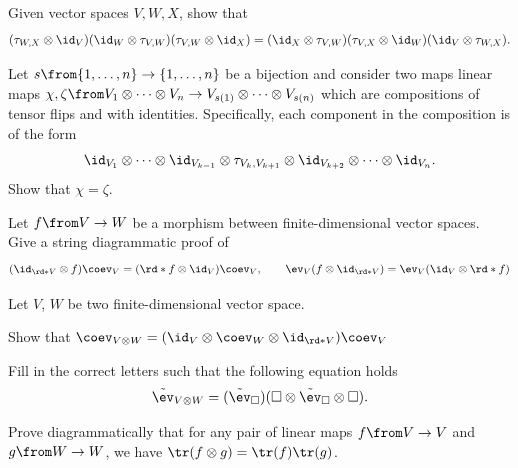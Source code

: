 \documentclass[a4paper,oneside, 12pt]{amsart}
\begin{document}
\begin{exercise}\label{exe:braid-relations}
  Given vector spaces \(V,W, X\), show that
  \begin{equation*}
    (\tau_{W,X}\otimes \id_{V})(\id_{W}\otimes \tau_{V,W})(\tau_{V,W}\otimes \id_{X})
    =
    (\id_{X}\otimes \tau_{V,W})(\tau_{V,X} \otimes \id_{W})(\id_{V}\otimes \tau_{W,X}).
  \end{equation*}

  Let \(s \from\{1, \dots , n\} \to \{1, \dots , n\}\) be a bijection and consider two maps linear maps \(\chi, \zeta \from V_{1} \otimes \dots \otimes V_{n} \to V_{s(1)} \otimes \dots \otimes V_{s(n)}\) which are compositions of tensor flips and  with identities.
  Specifically, each component in the composition is of the form
  \begin{equation*}
    \id_{V_1} \otimes \dots \otimes \id_{V_{k-1}} \otimes \tau_{V_k, V_{k+1}} \otimes \id_{V_{k+2}} \otimes \dots \otimes \id_{V_n}.
  \end{equation*}
  Show that  \(\chi = \zeta\).
\end{exercise}

\begin{exercise}
  Let \(f\from V\to W\) be a morphism between finite-dimensional vector spaces.
  Give a string diagrammatic proof of
  \begin{equation*}
    (\id_{\rd*{V}}\otimes f)\coev_{V} = (\rd*{f} \otimes \id_{V})\coev_{V}, \qquad
    \ev_V (f \otimes \id_{\rd*{V}}) = \ev_{V}(\id_{V}\otimes \rd*{f})
  \end{equation*}

\end{exercise}

\begin{exercise}
  Let \(V\), \(W\) be two finite-dimensional vector space.
  \begin{thmlist}
    \item Show that \(\coev_{V\otimes W} = (\id_{V} \otimes \coev_{W}\otimes \id_{\rd*{V}})\coev_{V}\)
    \item Fill in the correct letters such that the following equation holds
    \begin{equation*}
      \tilde{\ev}_{{V\otimes W}} = (\tilde{\ev}_{\square})(\square \otimes \tilde{\ev}_{\square} \otimes \square).
    \end{equation*}

    \item Prove diagrammatically that for any pair of linear maps \(f\from V\to V\) and \(g \from W \to W\), we have \(\tr(f \otimes g) = \tr(f)\tr(g)\).
  \end{thmlist}
\end{exercise}
\end{document}
